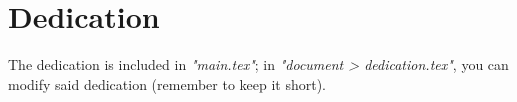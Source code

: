 \section{Dedication}
The dedication is included in \textit{"main.tex"}; in \textit{"document > dedication.tex"}, you can modify said dedication (remember to keep it short).